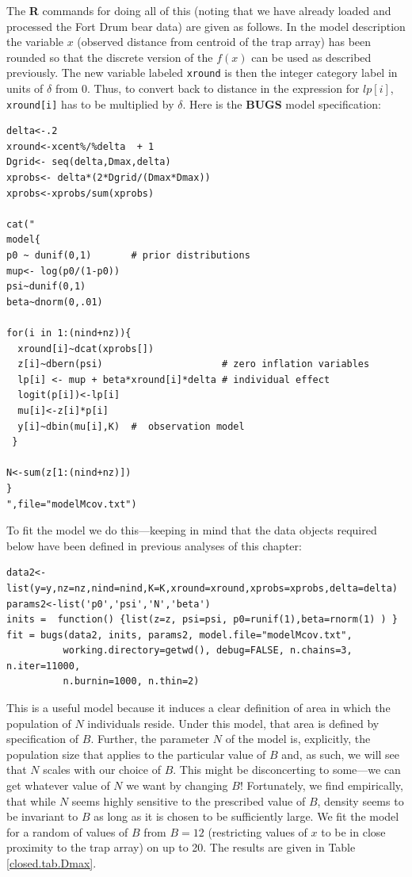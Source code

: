 The {\bf R} commands for doing all of this (noting that we have
already loaded and processed the Fort Drum bear data) are given as
follows. In the model description the variable $x$ (observed distance
from centroid of the trap array) has been rounded so that the discrete
version of the $f(x)$ can be used as described previously. The new
variable labeled \mbox{\tt xround} is then the integer category label
in units of $\delta$ from 0. Thus, to convert back to distance in the
expression for $lp[i]$, \mbox{\tt xround[i]} has to be multiplied by
$\delta$. Here is the {\bf BUGS} model specification:
{\small
\begin{verbatim}
delta<-.2
xround<-xcent%/%delta  + 1
Dgrid<- seq(delta,Dmax,delta)
xprobs<- delta*(2*Dgrid/(Dmax*Dmax))
xprobs<-xprobs/sum(xprobs)

cat("
model{
p0 ~ dunif(0,1)       # prior distributions
mup<- log(p0/(1-p0))
psi~dunif(0,1)
beta~dnorm(0,.01)

for(i in 1:(nind+nz)){
  xround[i]~dcat(xprobs[])
  z[i]~dbern(psi)                     # zero inflation variables
  lp[i] <- mup + beta*xround[i]*delta # individual effect
  logit(p[i])<-lp[i]
  mu[i]<-z[i]*p[i]
  y[i]~dbin(mu[i],K)  #  observation model
 }

N<-sum(z[1:(nind+nz)])
}
",file="modelMcov.txt")
\end{verbatim}
}
To fit the model we do this---keeping in mind that the data objects
required below have been defined in previous analyses of this chapter:
{\small
\begin{verbatim}
data2<-list(y=y,nz=nz,nind=nind,K=K,xround=xround,xprobs=xprobs,delta=delta)
params2<-list('p0','psi','N','beta')
inits =  function() {list(z=z, psi=psi, p0=runif(1),beta=rnorm(1) ) }
fit = bugs(data2, inits, params2, model.file="modelMcov.txt",
          working.directory=getwd(), debug=FALSE, n.chains=3, n.iter=11000,
          n.burnin=1000, n.thin=2)
\end{verbatim}
}

This is a useful model because it induces a clear definition of area
in which the population of $N$ individuals reside. Under this model,
that area is defined by specification of $B$.
Further, the parameter $N$ of the model is, explicitly, the
population size that applies to the particular value of $B$ and,
as such, we will see that $N$ scales with our choice of $B$.
This might be disconcerting to some---we can get whatever value of
$N$ we want by changing $B$!
Fortunately, we find empirically, that while $N$ seems
highly sensitive to the prescribed value of $B$, density seems to
be invariant to $B$ as long as it is chosen to be sufficiently
large. We fit the model for a random of values of $B$ from $B=12$ (restricting
values of $x$ to be in close proximity to
the trap array) on up to 20. The results are given in Table
\ref{closed.tab.Dmax}.

